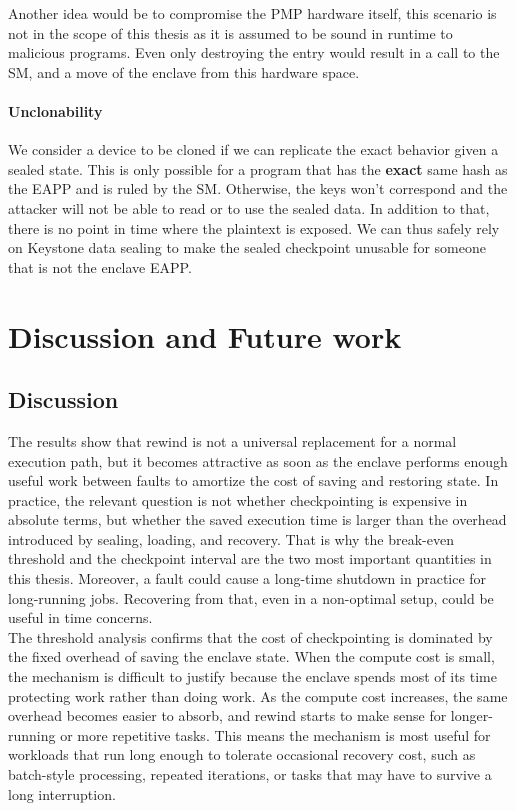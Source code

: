 \documentclass[11pt,a4paper]{report}
\begin{document}
Another idea would be to compromise the PMP hardware itself, this scenario is not in the scope of this thesis as it is assumed to be sound in runtime to malicious programs.
Even only destroying the entry would result in a call to the SM, and a move of the enclave from this hardware space.

\subsubsection{Unclonability}
We consider a device to be cloned if we can replicate the exact behavior given a sealed state.
This is only possible for a program that has the \textbf{exact} same hash as the EAPP and is ruled by the SM.
Otherwise, the keys won't correspond and the attacker will not be able to read or to use the sealed data.
In addition to that, there is no point in time where the plaintext is exposed.
We can thus safely rely on Keystone data sealing to make the sealed checkpoint unusable for someone that is not the enclave EAPP.


\chapter{Discussion and Future work}
\label{chap:discussion}

\section{Discussion}
The results show that rewind is not a universal replacement for a normal execution path, but it becomes attractive as soon as the enclave performs enough useful work between faults to amortize the cost of saving and restoring state. 
In practice, the relevant question is not whether checkpointing is expensive in absolute terms, but whether the saved execution time is larger than the overhead introduced by sealing, loading, and recovery. 
That is why the break-even threshold and the checkpoint interval are the two most important quantities in this thesis.
Moreover, a fault could cause a long-time shutdown in practice for long-running jobs.
Recovering from that, even in a non-optimal setup, could be useful in time concerns.
\\

The threshold analysis confirms that the cost of checkpointing is dominated by the fixed overhead of saving the enclave state.
When the compute cost is small, the mechanism is difficult to justify because the enclave spends most of its time protecting work rather than doing work.
As the compute cost increases, the same overhead becomes easier to absorb, and rewind starts to make sense for longer-running or more repetitive tasks.
This means the mechanism is most useful for workloads that run long enough to tolerate occasional recovery cost, such as batch-style processing, repeated iterations, or tasks that may have to survive a long interruption.
 \\
\end{document}
